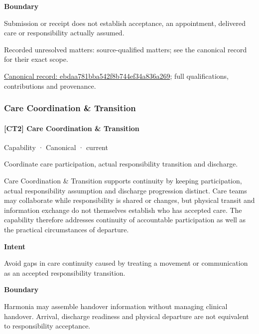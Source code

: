 \textbf{Boundary}



Submission or receipt does not establish acceptance, an appointment, delivered care or responsibility actually assumed.


{\small Recorded unresolved matters: source-qualified matters; see the canonical record for their exact scope.}\par
{\footnotesize \href{../../../../continuum/strategy/capability/ebdaa781bba542f8b744ef34a836a269.md}{Canonical record: ebdaa781bba542f8b744ef34a836a269}; full qualifications, contributions and provenance.}\par
\subsubsection{Care Coordination \& Transition}

\paragraph{[CT2] Care Coordination \& Transition}

\label{element:174a9b93d19c44828f20360e9d543925}
{\small Capability · Canonical · current}\par

Coordinate care participation, actual responsibility transition and discharge.



Care Coordination \& Transition supports continuity by keeping participation, actual responsibility assumption and discharge progression distinct. Care teams may collaborate while responsibility is shared or changes, but physical transit and information exchange do not themselves establish who has accepted care. The capability therefore addresses continuity of accountable participation as well as the practical circumstances of departure.



\textbf{Intent}



Avoid gaps in care continuity caused by treating a movement or communication as an accepted responsibility transition.



\textbf{Boundary}



Harmonia may assemble handover information without managing clinical handover. Arrival, discharge readiness and physical departure are not equivalent to responsibility acceptance.


